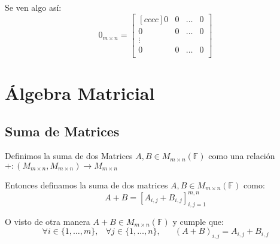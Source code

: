\documentclass[12pt]{report}                                    %
\DeclareMathOperator \Space {\quad}                             %
\DeclareMathOperator \MiniSpace {\;}                            %
\begin{document}
                Se ven algo así:
                \begin{equation*}
                    0_{m \times n} =
                    \begin{bmatrix}[cccc]
                        0 & 0 & \dots & 0   \\
                        0 & 0 & \dots & 0   \\
                        \vdots              \\
                        0 & 0 & \dots & 0   \\
                    \end{bmatrix}
                \end{equation*}












    \clearpage
    \chapter{Álgebra Matricial}

        \clearpage
        \section{Suma de Matrices}

            Definimos la suma de dos Matrices $A, B \in M_{m \times n}(\mathbb{F})$ como una relación 
            \\ $+: (M_{m \times n}, M_{m \times n}) \to M_{m \times n}$

            Entonces definamos la suma de dos matrices $A, B \in M_{m \times n}(\mathbb{F})$ como:
            \begin{equation}
                A + B = [A_{i, j} + B_{i, j}]_{i, j = 1}^{m, n}
            \end{equation}

            O visto de otra manera $A + B \in M_{m \times n}(\mathbb{F})$ y cumple que:
            \begin{equation}
                \forall i \in \{1, \dots, m\} ,\MiniSpace
                    \forall j \in \{1, \dots, n\} ,\Space
                        (A+B)_{i, j} = A_{i, j} + B_{i, j}
            \end{equation}
\end{document}
